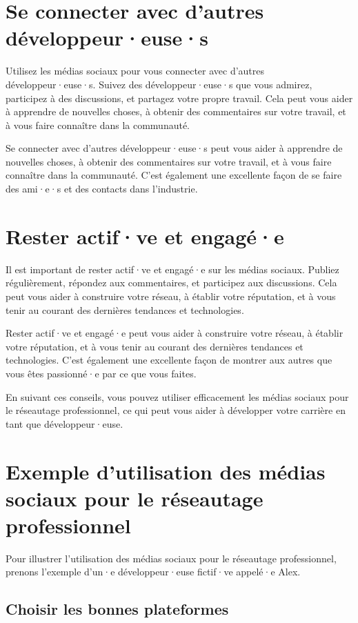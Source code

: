 \section{Se connecter avec d'autres développeur·euse·s}

Utilisez les médias sociaux pour vous connecter avec d'autres développeur·euse·s. Suivez des développeur·euse·s que vous admirez, participez à des discussions, et partagez votre propre travail. Cela peut vous aider à apprendre de nouvelles choses, à obtenir des commentaires sur votre travail, et à vous faire connaître dans la communauté.

Se connecter avec d'autres développeur·euse·s peut vous aider à apprendre de nouvelles choses, à obtenir des commentaires sur votre travail, et à vous faire connaître dans la communauté. C'est également une excellente façon de se faire des ami·e·s et des contacts dans l'industrie.

\section{Rester actif·ve et engagé·e}

Il est important de rester actif·ve et engagé·e sur les médias sociaux. Publiez régulièrement, répondez aux commentaires, et participez aux discussions. Cela peut vous aider à construire votre réseau, à établir votre réputation, et à vous tenir au courant des dernières tendances et technologies.

Rester actif·ve et engagé·e peut vous aider à construire votre réseau, à établir votre réputation, et à vous tenir au courant des dernières tendances et technologies. C'est également une excellente façon de montrer aux autres que vous êtes passionné·e par ce que vous faites.

En suivant ces conseils, vous pouvez utiliser efficacement les médias sociaux pour le réseautage professionnel, ce qui peut vous aider à développer votre carrière en tant que développeur·euse.

\section{Exemple d'utilisation des médias sociaux pour le réseautage professionnel}

Pour illustrer l'utilisation des médias sociaux pour le réseautage professionnel, prenons l'exemple d'un·e développeur·euse fictif·ve appelé·e Alex.

\subsection{Choisir les bonnes plateformes}

